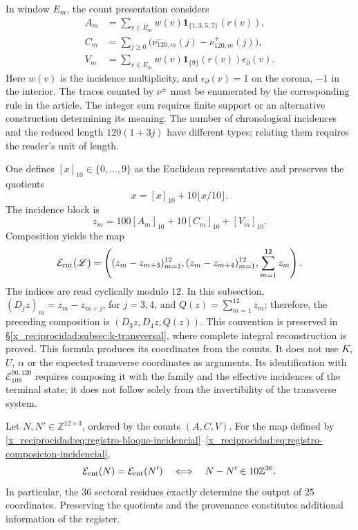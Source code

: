 In window \(E_m\), the count presentation considers
\begin{align}
 A_m&=\sum_{v\in E_m}w(v)
             \mathbf1_{\{1,3,5,7\}}(r(v)),\\
 C_m&=\sum_{j\geq0}\bigl(\nu^-_{120,m}(j)-\nu^+_{120,m}(j)\bigr),\\
 V_m&=\sum_{v\in E_m}w(v)\mathbf1_{\{9\}}(r(v))\epsilon_\partial(v).
\end{align}
Here \(w(v)\) is the incidence multiplicity, and
\(\epsilon_\partial(v)=1\) on the corona, \(-1\) in the interior.
The traces counted by \(\nu^\pm\) must be enumerated by the
corresponding rule in the article. The integer sum requires finite support or an
alternative construction determining its meaning. The number of
chronological incidences and the reduced length \(120(1+3j)\) have
different types; relating them requires the reader's unit of length.

One defines \([x]_{10}\in\{0,\ldots,9\}\) as the Euclidean
representative and preserves the quotients
\[
 x=[x]_{10}+10\lfloor x/10\rfloor.
\]
The incidence block is
\begin{equation}
 z_m=100[A_m]_{10}+10[C_m]_{10}+[V_m]_{10}.
 \label{x_reciprocidad:eq:registro-bloque-incidencial}
\end{equation}
Composition yields the map
\begin{equation}
 \mathcal E_{\rm cnt}(\mathscr L)=
 \left((z_m-z_{m+3})_{m=1}^{12},
       (z_m-z_{m+4})_{m=1}^{12},\sum_{m=1}^{12}z_m\right).
\label{x_reciprocidad:eq:registro-composicion-incidencial}
\end{equation}
The indices are read cyclically modulo \(12\). In this subsection,
\((D_jz)_m=z_m-z_{m+j}\), for \(j=3,4\), and
\(Q(z)=\sum_{m=1}^{12}z_m\); therefore, the preceding composition is
\((D_3z,D_4z,Q(z))\). This convention is preserved in
\S\ref{x_reciprocidad:subsec:k-transversal}, where complete integral
reconstruction is proved.
This formula produces its coordinates from the counts. It does not use
\(K\), \(U\), \(\alpha\) or the expected transverse coordinates
as arguments. Its identification with
\(\mathcal E_{108}^{90,120}\) requires composing it with the family and
the effective incidences of the terminal state; it does not follow solely
from the invertibility of the transverse system.

\begin{proposition}
\label{x_reciprocidad:prop:registro-36-residuos}
Let \(N,N'\in\mathbb Z^{12\times3}\), ordered by the counts
\((A,C,V)\). For the map defined by
\eqref{x_reciprocidad:eq:registro-bloque-incidencial}--\eqref{x_reciprocidad:eq:registro-composicion-incidencial},
\[
 \mathcal E_{\rm cnt}(N)=\mathcal E_{\rm cnt}(N')
 \quad\Longleftrightarrow\quad
 N-N'\in10\mathbb Z^{36}.
\]
In particular, the \(36\) sectoral residues exactly determine
the output of \(25\) coordinates. Preserving the quotients and
the provenance constitutes additional information of the register.
\end{proposition}

